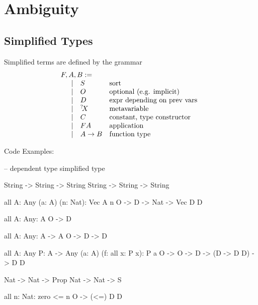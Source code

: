 \section{Ambiguity}




\subsection{Simplified Types}

Simplified terms are defined by the grammar
$$
\begin{array}{lllll} 
    F, A, B :=
    \\
    \quad
    \begin{array}{lllll} 
        \mid&
        S &\text{sort}
        \\
        \mid&
        O &\text{optional (e.g. implicit)}
        \\
        \mid&
        D &\text{expr depending on prev vars}
        \\
        \mid&
        {{}^? \kern-0.2em X} &\text{metavariable}
        \\
        \mid&
        C &\text{constant, type constructor}
        \\
        \mid&
        F A &\text{application}
        \\
        \mid&
        A \to B &\text{function type}
     \end{array}
 \end{array}
$$


Code Examples:
\begin{alba}
    -- dependent type                               simplified type
 
    String -> String -> String                      String -> String -> String

    all {A: Any} (a: A) (n: Nat): Vec A n           O -> D -> Nat -> Vec D D

    all {A: Any}: A                                 O -> D

    all {A: Any}: A -> A                            O -> D -> D

    all {A: Any} {P: A -> Any} (a: A) (f: all x: P x): P a
                                                    O -> O -> D -> (D -> D D) -> D D

    Nat -> Nat -> Prop                              Nat -> Nat -> S

    all {n: Nat}: zero <= n                         O -> (<=) D D
\end{alba}

